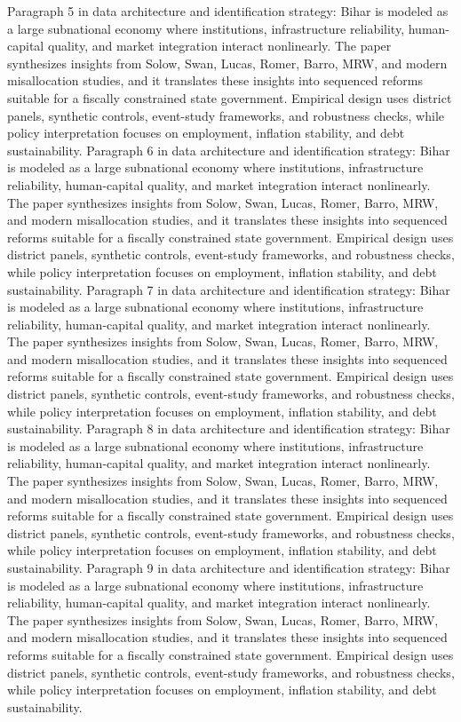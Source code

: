 \documentclass[preprint,12pt]{elsarticle}
\begin{document}
Paragraph 5 in data architecture and identification strategy: Bihar is modeled as a large subnational economy where institutions, infrastructure reliability, human-capital quality, and market integration interact nonlinearly. The paper synthesizes insights from Solow, Swan, Lucas, Romer, Barro, MRW, and modern misallocation studies, and it translates these insights into sequenced reforms suitable for a fiscally constrained state government. Empirical design uses district panels, synthetic controls, event-study frameworks, and robustness checks, while policy interpretation focuses on employment, inflation stability, and debt sustainability.
Paragraph 6 in data architecture and identification strategy: Bihar is modeled as a large subnational economy where institutions, infrastructure reliability, human-capital quality, and market integration interact nonlinearly. The paper synthesizes insights from Solow, Swan, Lucas, Romer, Barro, MRW, and modern misallocation studies, and it translates these insights into sequenced reforms suitable for a fiscally constrained state government. Empirical design uses district panels, synthetic controls, event-study frameworks, and robustness checks, while policy interpretation focuses on employment, inflation stability, and debt sustainability.
Paragraph 7 in data architecture and identification strategy: Bihar is modeled as a large subnational economy where institutions, infrastructure reliability, human-capital quality, and market integration interact nonlinearly. The paper synthesizes insights from Solow, Swan, Lucas, Romer, Barro, MRW, and modern misallocation studies, and it translates these insights into sequenced reforms suitable for a fiscally constrained state government. Empirical design uses district panels, synthetic controls, event-study frameworks, and robustness checks, while policy interpretation focuses on employment, inflation stability, and debt sustainability.
Paragraph 8 in data architecture and identification strategy: Bihar is modeled as a large subnational economy where institutions, infrastructure reliability, human-capital quality, and market integration interact nonlinearly. The paper synthesizes insights from Solow, Swan, Lucas, Romer, Barro, MRW, and modern misallocation studies, and it translates these insights into sequenced reforms suitable for a fiscally constrained state government. Empirical design uses district panels, synthetic controls, event-study frameworks, and robustness checks, while policy interpretation focuses on employment, inflation stability, and debt sustainability.
Paragraph 9 in data architecture and identification strategy: Bihar is modeled as a large subnational economy where institutions, infrastructure reliability, human-capital quality, and market integration interact nonlinearly. The paper synthesizes insights from Solow, Swan, Lucas, Romer, Barro, MRW, and modern misallocation studies, and it translates these insights into sequenced reforms suitable for a fiscally constrained state government. Empirical design uses district panels, synthetic controls, event-study frameworks, and robustness checks, while policy interpretation focuses on employment, inflation stability, and debt sustainability.
\end{document}
